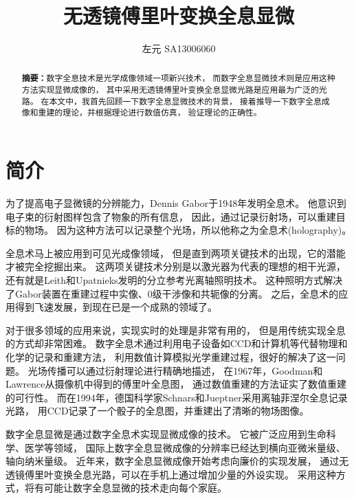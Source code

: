 \documentclass[11pt,a4paper]{article}
\title{无透镜傅里叶变换全息显微}
\author{左元 SA13006060}
\date{\vspace{-5ex}}
\begin{document}
\maketitle

\begin{abstract}
\noindent
\textbf{摘要：}数字全息技术是光学成像领域一项新兴技术，
而数字全息显微技术则是应用这种方法实现显微成像的，
其中采用无透镜傅里叶变换全息显微光路是应用最为广泛的光路。
在本文中，我首先回顾一下数字全息显微技术的背景，
接着推导一下数字全息成像和重建的理论，并根据理论进行数值仿真，
验证理论的正确性。
\end{abstract}

\section{简介}
为了提高电子显微镜的分辨能力，Dennis Gabor于1948年发明全息术。
他意识到电子束的衍射图样包含了物象的所有信息，
因此，通过记录衍射场，可以重建目标的物场。
因为这种方法可以记录整个光场，所以他称之为全息术(holography)\cite{gabor1948new, kim2010principles}。

全息术马上被应用到可见光成像领域，
但是直到两项关键技术的出现，它的潜能才被完全挖掘出来。
这两项关键技术分别是以激光器为代表的理想的相干光源，
还有就是Leith和Upatnieks发明的分立参考光离轴照明技术\cite{leith1962reconstructed}。
这种照明方式解决了Gabor装置在重建过程中实像、0级干涉像和共轭像的分离。
之后，全息术的应用得到飞速发展，到现在已是一个成熟的领域了。

对于很多领域的应用来说，实现实时的处理是非常有用的，
但是用传统实现全息的方式却非常困难。
数字全息术通过利用电子设备如CCD和计算机等代替物理和化学的记录和重建方法，
利用数值计算模拟光学重建过程，很好的解决了这一问题。
光场传播可以通过衍射理论进行精确地描述，
在1967年，Goodman和Lawrence从摄像机中得到的傅里叶全息图，
通过数值重建的方法证实了数值重建的可行性\cite{goodman1967digital}。
而在1994年，德国科学家Schnars和Jueptner采用离轴菲涅尔全息记录光路，
用CCD记录了一个骰子的全息图，并重建出了清晰的物场图像\cite{schnars1994direct}。

数字全息显微是通过数字全息术实现显微成像的技术。
它被广泛应用到生命科学、医学等领域，
国际上数字全息显微成像的分辨率已经达到横向亚微米量级、轴向纳米量级\cite{kemper2008digital,marquet2005digital,mann2006quantitative}。
近年来，数字全息显微成像开始考虑向廉价的实现发展，
通过无透镜傅里叶变换全息光路，可以在手机上通过增加少量的外设实现\cite{breslauer2009mobile,tseng2010lensfree,vashist2014cellphone}。
采用这种方式，将有可能让数字全息显微的技术走向每个家庭。
\end{document}
